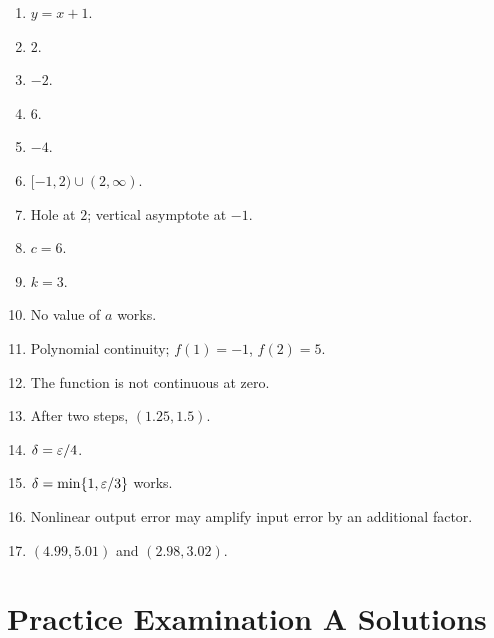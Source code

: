 \begin{enumerate}[label=\textbf{R\arabic*.}]
  \item \(y=x+1\).
  \item \(2\).
  \item \(-2\).
  \item \(6\).
  \item \(-4\).
  \item \([-1,2)\cup(2,\infty)\).
  \item Hole at \(2\); vertical asymptote at \(-1\).
  \item \(c=6\).
  \item \(k=3\).
  \item No value of \(a\) works.
  \item Polynomial continuity; \(f(1)=-1\), \(f(2)=5\).
  \item The function is not continuous at zero.
  \item After two steps, \((1.25,1.5)\).
  \item \(\delta=\varepsilon/4\).
  \item \(\delta=\min\{1,\varepsilon/3\}\) works.
  \item Nonlinear output error may amplify input error by an additional factor.
  \item \((4.99,5.01)\) and \((2.98,3.02)\).
\end{enumerate}

\section{Practice Examination A Solutions}

